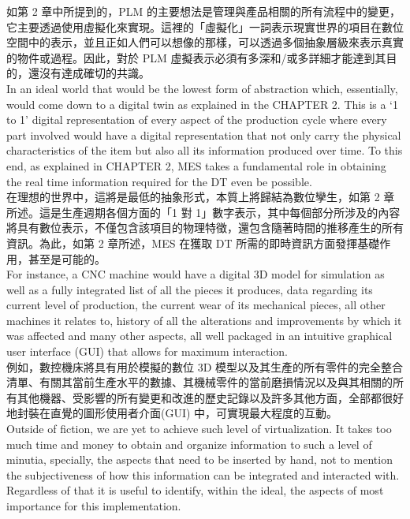 \fontsize{14pt}{5pt}\sectionef
 {如第 2 章中所提到的，PLM 的主要想法是管理與產品相關的所有流程中的變更，它主要透過使用虛擬化來實現。這裡的「虛擬化」一詞表示現實世界的項目在數位空間中的表示，並且正如人們可以想像的那樣，可以透過多個抽象層級來表示真實的物件或過程。因此，對於 PLM 虛擬表示必須有多深和/或多詳細才能達到其目的，還沒有達成確切的共識。}\\[15pt]

\fontsize{14pt}{2.5pt}\sectionef 
{In an ideal world that would be the lowest form of abstraction which, essentially, would come down to a digital twin as explained in the CHAPTER 2. This is a ‘1 to 1’ digital representation of every aspect of the production cycle where every part involved would have a digital representation that not only carry the physical characteristics of the item but also all its information produced over time. To this end, as explained in CHAPTER 2, MES takes a fundamental role in obtaining the real time information required for the DT even be possible.}\\[10pt]

\fontsize{14pt}{5pt}\sectionef
 {在理想的世界中，這將是最低的抽象形式，本質上將歸結為數位孿生，如第 2 章所述。這是生產週期各個方面的「1 對 1」數字表示，其中每個部分所涉及的內容將具有數位表示，不僅包含該項目的物理特徵，還包含隨著時間的推移產生的所有資訊。為此，如第 2 章所述，MES 在獲取 DT 所需的即時資訊方面發揮基礎作用，甚至是可能的。}\\[15pt]

\fontsize{14pt}{2.5pt}\sectionef 
{For instance, a CNC machine would have a digital 3D model for simulation as well as a fully integrated list of all the pieces it produces, data regarding its current level of production, the current wear of its mechanical pieces, all other machines it relates to, history of all the alterations and improvements by which it was affected and many other aspects, all well packaged in an intuitive graphical user interface (GUI) that allows for maximum interaction.}\\[10pt]

\fontsize{14pt}{5pt}\sectionef
 {例如，數控機床將具有用於模擬的數位 3D 模型以及其生產的所有零件的完全整合清單、有關其當前生產水平的數據、其機械零件的當前磨損情況以及與其相關的所有其他機器、受影響的所有變更和改進的歷史記錄以及許多其他方面，全部都很好地封裝在直覺的圖形使用者介面(GUI) 中，可實現最大程度的互動。}\\[15pt]

\fontsize{14pt}{2.5pt}\sectionef 
{Outside of fiction, we are yet to achieve such level of virtualization. It takes too much time and money to obtain and organize information to such a level of minutia, specially, the aspects that need to be inserted by hand, not to mention the subjectiveness of how this information can be integrated and interacted with. Regardless of that it is useful to identify, within the ideal, the aspects of most importance for this implementation.}\\[10pt]

